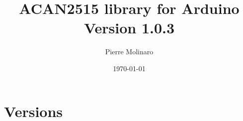 \documentclass[10pt, a4paper, obeyspaces, openany]{extarticle}
\begin{document}
 


\title{\bf \Huge{ACAN2515 library for Arduino\\Version 1.0.3}}
\author{Pierre Molinaro}
\date {\today}

\maketitle


\tableofcontents


\section{Versions}
\end{document}
